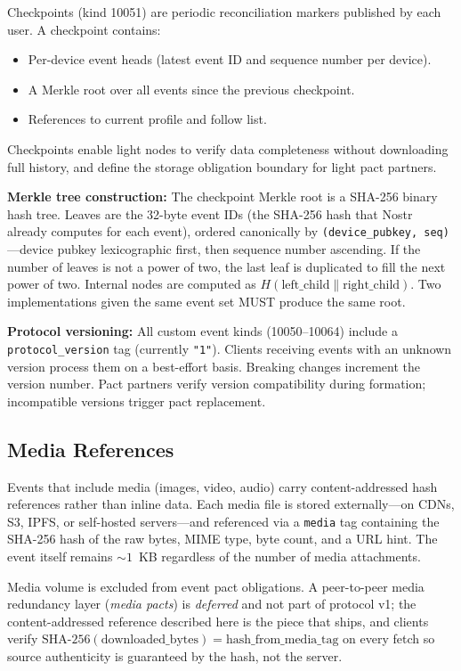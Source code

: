 \documentclass[11pt,a4paper]{article}
\begin{document}
Checkpoints (kind 10051) are periodic reconciliation markers published by each user. A checkpoint contains:

\begin{itemize}
  \item Per-device event heads (latest event ID and sequence number per device).
  \item A Merkle root over all events since the previous checkpoint.
  \item References to current profile and follow list.
\end{itemize}

Checkpoints enable light nodes to verify data completeness without downloading full history, and define the storage obligation boundary for light pact partners.

\textbf{Merkle tree construction:} The checkpoint Merkle root is a SHA-256 binary hash tree. Leaves are the 32-byte event IDs (the SHA-256 hash that Nostr already computes for each event), ordered canonically by \texttt{(device\_pubkey, seq)}---device pubkey lexicographic first, then sequence number ascending. If the number of leaves is not a power of two, the last leaf is duplicated to fill the next power of two. Internal nodes are computed as $H(\text{left\_child} \| \text{right\_child})$. Two implementations given the same event set MUST produce the same root.

\textbf{Protocol versioning:} All custom event kinds (10050--10064) include a \texttt{protocol\_version} tag (currently \texttt{"1"}). Clients receiving events with an unknown version process them on a best-effort basis. Breaking changes increment the version number. Pact partners verify version compatibility during formation; incompatible versions trigger pact replacement.

\subsection{Media References}

Events that include media (images, video, audio) carry content-addressed hash references rather than inline data. Each media file is stored externally---on CDNs, S3, IPFS, or self-hosted servers---and referenced via a \texttt{media} tag containing the SHA-256 hash of the raw bytes, MIME type, byte count, and a URL hint. The event itself remains ${\sim}1$~KB regardless of the number of media attachments.

Media volume is excluded from event pact obligations. A peer-to-peer media redundancy layer (\emph{media pacts}) is \emph{deferred} and not part of protocol v1; the content-addressed reference described here is the piece that ships, and clients verify $\text{SHA-256}(\text{downloaded\_bytes}) = \text{hash\_from\_media\_tag}$ on every fetch so source authenticity is guaranteed by the hash, not the server.
\end{document}

